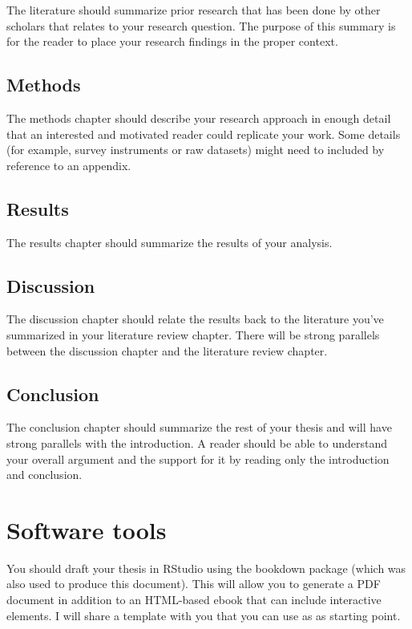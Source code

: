 \documentclass[
]{book}
\begin{document}
The literature should summarize prior research that has been done by other scholars that relates to your research question. The purpose of this summary is for the reader to place your research findings in the proper context.

\hypertarget{methods}{%
\section{Methods}\label{methods}}

The methods chapter should describe your research approach in enough detail that an interested and motivated reader could replicate your work. Some details (for example, survey instruments or raw datasets) might need to included by reference to an appendix.

\hypertarget{results}{%
\section{Results}\label{results}}

The results chapter should summarize the results of your analysis.

\hypertarget{discussion}{%
\section{Discussion}\label{discussion}}

The discussion chapter should relate the results back to the literature you've summarized in your literature review chapter. There will be strong parallels between the discussion chapter and the literature review chapter.

\hypertarget{conclusion}{%
\section{Conclusion}\label{conclusion}}

The conclusion chapter should summarize the rest of your thesis and will have strong parallels with the introduction. A reader should be able to understand your overall argument and the support for it by reading only the introduction and conclusion.

\hypertarget{software-tools}{%
\chapter{Software tools}\label{software-tools}}

You should draft your thesis in RStudio using the bookdown package (which was also used to produce this document). This will allow you to generate a PDF document in addition to an HTML-based ebook that can include interactive elements. I will share a template with you that you can use as as starting point.
\end{document}
